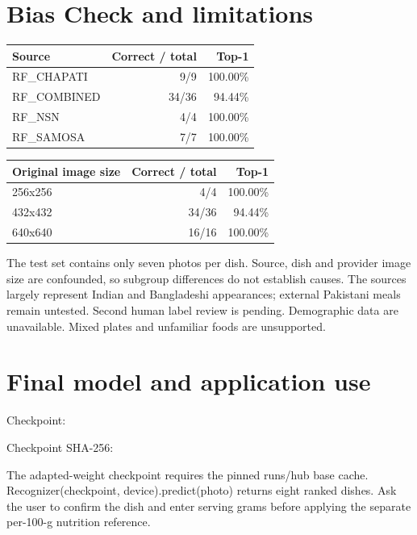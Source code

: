 \documentclass[10pt,a4paper]{article}
\begin{document}
\section*{Bias Check and limitations}
\begin{center}\footnotesize\setlength{\tabcolsep}{4pt}
\begin{tabularx}{\linewidth}{Xrr}
\toprule
Source & Correct / total & Top-1 \\
\midrule
RF\_CHAPATI & 9/9 & 100.00\% \\
RF\_COMBINED & 34/36 & 94.44\% \\
RF\_NSN & 4/4 & 100.00\% \\
RF\_SAMOSA & 7/7 & 100.00\% \\
\bottomrule\end{tabularx}\end{center}
\begin{center}\footnotesize\setlength{\tabcolsep}{4pt}
\begin{tabularx}{\linewidth}{Xrr}
\toprule
Original image size & Correct / total & Top-1 \\
\midrule
256x256 & 4/4 & 100.00\% \\
432x432 & 34/36 & 94.44\% \\
640x640 & 16/16 & 100.00\% \\
\bottomrule\end{tabularx}\end{center}
The test set contains only seven photos per dish. Source, dish and provider image size are confounded, so subgroup differences do not establish causes. The sources largely represent Indian and Bangladeshi appearances; external Pakistani meals remain untested. Second human label review is pending. Demographic data are unavailable. Mixed plates and unfamiliar foods are unsupported.

\section*{Final model and application use}
Checkpoint: \par
Checkpoint SHA-256: \par
The adapted-weight checkpoint requires the pinned runs/hub base cache. Recognizer(checkpoint, device).predict(photo) returns eight ranked dishes. Ask the user to confirm the dish and enter serving grams before applying the separate per-100-g nutrition reference.
\end{document}
